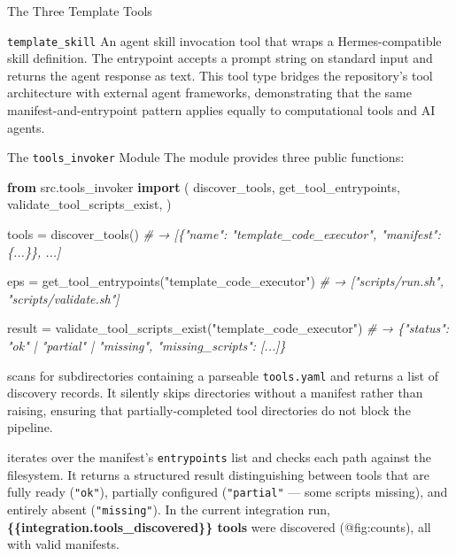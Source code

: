 \documentclass[
  ignorenonframetext,
]{beamer}
\newenvironment{Shaded}{}{}
\newcommand{\CommentTok}[1]{\textcolor[rgb]{0.38,0.63,0.69}{\textit{#1}}}
\newcommand{\ImportTok}[1]{\textcolor[rgb]{0.00,0.50,0.00}{\textbf{#1}}}
\newcommand{\NormalTok}[1]{#1}
\newcommand{\OperatorTok}[1]{\textcolor[rgb]{0.40,0.40,0.40}{#1}}
\newcommand{\StringTok}[1]{\textcolor[rgb]{0.25,0.44,0.63}{#1}}
\begin{document}
\begin{frame}{The Three Template Tools}
\begin{block}{\texttt{template\_skill}}
\protect{}\label{template_skill}
An agent skill invocation tool that wraps a Hermes-compatible skill
definition. The entrypoint  accepts a prompt
string on standard input and returns the agent response as text. This
tool type bridges the repository's tool architecture with external agent
frameworks, demonstrating that the same manifest-and-entrypoint pattern
applies equally to computational tools and AI agents.
\end{block}
\end{frame}

\begin{frame}{The \texttt{tools\_invoker}
Module}
\protect{}\label{the-tools_invoker-module}
The  module provides three public
functions:

\begin{Shaded}
\begin{Highlighting}[]
\ImportTok{from}\NormalTok{ src.tools\_invoker }\ImportTok{import}\NormalTok{ (}
\NormalTok{    discover\_tools,}
\NormalTok{    get\_tool\_entrypoints,}
\NormalTok{    validate\_tool\_scripts\_exist,}
\NormalTok{)}

\NormalTok{tools }\OperatorTok{=}\NormalTok{ discover\_tools()}
\CommentTok{\# → [\{"name": "template\_code\_executor", "manifest": \{...\}\}, ...]}

\NormalTok{eps }\OperatorTok{=}\NormalTok{ get\_tool\_entrypoints(}\StringTok{"template\_code\_executor"}\NormalTok{)}
\CommentTok{\# → ["scripts/run.sh", "scripts/validate.sh"]}

\NormalTok{result }\OperatorTok{=}\NormalTok{ validate\_tool\_scripts\_exist(}\StringTok{"template\_code\_executor"}\NormalTok{)}
\CommentTok{\# → \{"status": "ok" | "partial" | "missing", "missing\_scripts": [...]\}}
\end{Highlighting}
\end{Shaded}

 scans  for
subdirectories containing a parseable \texttt{tools.yaml} and returns a
list of discovery records. It silently skips directories without a
manifest rather than raising, ensuring that partially-completed tool
directories do not block the pipeline.

 iterates over the manifest's
\texttt{entrypoints} list and checks each path against the filesystem.
It returns a structured result distinguishing between tools that are
fully ready (\texttt{"ok"}), partially configured (\texttt{"partial"}
--- some scripts missing), and entirely absent (\texttt{"missing"}). In
the current integration run,
\textbf{\{\{integration.tools\_discovered\}\} tools} were discovered
(@fig:counts), all with valid manifests.
\end{frame}
\end{document}
